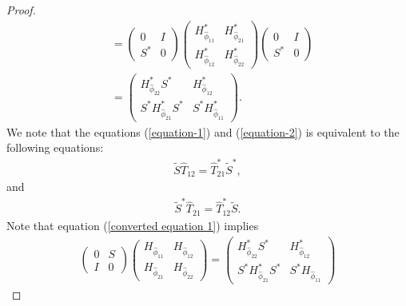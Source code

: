 \documentclass[10pt,a4paper]{amsart}
\begin{document}
\begin{proof}
\begin{align*}
                &=\begin{pmatrix}
                0&I\\
                S^*&0
            \end{pmatrix}
            \begin{pmatrix}
                H^*_{\hat{\phi}_{11}}&H^*_{\hat{\phi}_{21}}\\
                H^*_{\hat{\phi}_{12}}&H^*_{\hat{\phi}_{22}}
                \end{pmatrix}
            \begin{pmatrix}
                0&I\\
                S^*&0
            \end{pmatrix}\\
            &=\begin{pmatrix}
                H^*_{\hat{\phi}_{22}}S^*&H^*_{\hat{\phi}_{12}}\\
                S^*H^*_{\hat{\phi}_{21}}S^*&S^*H^*_{\hat{\phi}_{11}}
            \end{pmatrix}.
            \end{align*}
            We note that the equations (\ref{equation-1}) and (\ref{equation-2}) is equivalent to the following equations:
            \begin{align}\label{converted equation 1}
                \tilde S \hat T_{12}=\hat T^*_{21}{\tilde S}^*,
            \end{align}
            and
            \begin{align}\label{converted equation 2}
                 {\tilde S}^* \hat T_{21}=\hat T^*_{12}\tilde S.
            \end{align}
            Note that equation (\ref{converted equation 1}) implies
            \begin{align*}
                \begin{pmatrix}
                0&S\\
                I&0
            \end{pmatrix}
            \begin{pmatrix}
                H_{\hat{\phi}_{11}}&H_{\hat{\phi}_{12}}\\
                H_{\hat{\phi}_{21}}&H_{\hat{\phi}_{22}}
                \end{pmatrix}
                =\begin{pmatrix}
                H^*_{\hat{\phi}_{22}}S^*&H^*_{\hat{\phi}_{12}}\\
                S^*H^*_{\hat{\phi}_{21}}S^*&S^*H_{\hat{\phi}_{11}}

\end{pmatrix}
\end{align*}
\end{proof}
\end{document}
